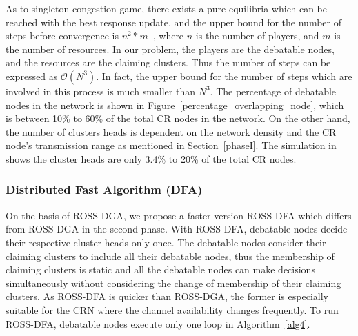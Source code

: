 \documentclass[times]{ettauth}
\theoremstyle{mytheoremstyle}
\theoremstyle{mytheoremstyle}
\theoremstyle{mytheoremstyle}
\begin{document}
As to singleton congestion game, there exists a pure equilibria which can be reached with the best response update, and the upper bound for the number of steps before convergence is $n^2*m$~\cite{Ackermann06purenash}, where $n$ is the number of players, and $m$ is the number of resources.
In our problem, the players are the debatable nodes, and the resources are the claiming clusters.
Thus the number of steps can be expressed as $\mathcal{O}(N^3)$.
%
In fact, the upper bound for the number of steps which are involved in this process is much smaller than $N^3$.
The percentage of debatable nodes in the network is shown in Figure~\ref{percentage_overlapping_node}, which is between 10\% to 60\% of the total CR nodes in the network.
On the other hand, the number of clusters heads is dependent on the network density and the CR node's transmission range as mentioned in Section~\ref{phaseI}.
The simulation in \cite{robust_clustering_arxiv} shows the cluster heads are only 3.4\% to 20\% of the total CR nodes.




\subsubsection{Distributed Fast Algorithm (DFA)}
On the basis of ROSS-DGA, we propose a faster version ROSS-DFA which differs from ROSS-DGA in the second phase.
With ROSS-DFA, debatable nodes decide their respective cluster heads only once.
The debatable nodes consider their claiming clusters to include all their debatable nodes, thus the membership of claiming clusters is static and all the debatable nodes can make decisions simultaneously without considering the change of membership of their claiming clusters.
As ROSS-DFA is quicker than ROSS-DGA, the former is especially suitable for the CRN where the channel availability changes frequently.
To run ROSS-DFA, debatable nodes execute only one loop in Algorithm~\ref{alg4}.
\end{document}
